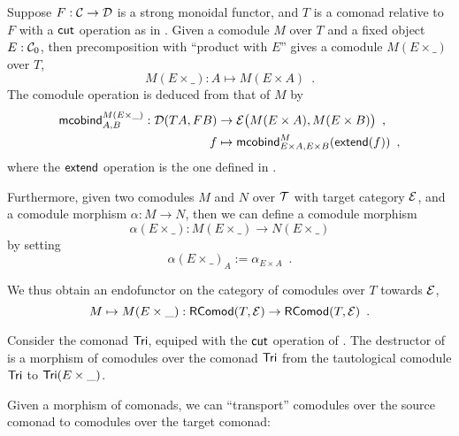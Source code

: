 \documentclass{amsart}
\begin{document}
\begin{definition}\label{def:product_in_context}
 Suppose $F:{\mathcal{C}}\to\mathcal{D}$ is a strong monoidal functor, and $T$ is a comonad relative to $F$ with a $\mathsf{cut}$ operation 
 as in .
 Given a comodule $M$ over $T$ and a fixed object $E:{\mathcal{C}}_0$, then precomposition with \enquote{product with $E$}
 gives a comodule $M(E\times\_)$ over $T$,
  \[    M(E\times \_) : A \mapsto M(E\times A) \enspace . \]
 The comodule operation is deduced from that of $M$ by 
 \begin{align*} \mathsf{mcobind}^{M(E\times\_)}_{A,B} : \mathcal{D}(TA,FB)&\to \mathcal{E}\bigl(M(E\times A), M(E\times B)\bigr) \enspace ,\\
                                                      f &\mapsto \mathsf{mcobind}^M_{E\times A,E\times B}(\mathsf{extend}(f)) \enspace ,
  \end{align*}                                        
where the $\mathsf{extend}$ operation is the one defined in .
 
 Furthermore, given two comodules $M$ and $N$ over $\mathcal{T}$ with target category $\mathcal{E}$, and a comodule morphism $\alpha : M \to N$, then 
 we can define a comodule morphism \[\alpha(E\times \_) : M(E\times \_) \to N(E\times \_) \] by setting
          \[ \alpha(E \times \_)_A := \alpha_{E\times A} \enspace . \]
  
  \noindent
  We thus obtain an endofunctor on the category of comodules over $T$ towards $\mathcal{E}$,
   \[ M \mapsto  M (E\times \_) : \mathsf{RComod}(T,\mathcal{E}) \to \mathsf{RComod}(T,\mathcal{E}) \enspace . \]
\end{definition}






\begin{example}\label{ex:tail_comodule}
 Consider the comonad $\mathsf{Tri}$, equiped with the $\mathsf{cut}$ operation of .
 The destructor \constfont{\tail} of  is a morphism of comodules over the comonad $\mathsf{Tri}$ 
  from the tautological comodule  $\mathsf{Tri}$ to $\mathsf{Tri}(E\times \_)$.
\end{example}





Given a morphism of comonads, we can \enquote{transport} comodules over the source comonad to comodules over the target comonad:
\end{document}
